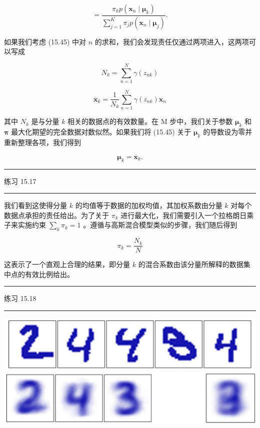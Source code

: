 \documentclass[10pt]{report}
\newcommand{\HRule}{\begin{center}\rule{0.9\linewidth}{0.2mm}\end{center}}
\begin{document}
\[
= \frac{{\pi }_{k}p\left( {{\mathbf{x}}_{n} \mid  {\mathbf{\mu }}_{k}}\right) }{\mathop{\sum }\limits_{{j = 1}}^{K}{\pi }_{j}p\left( {{\mathbf{x}}_{n} \mid  {\mathbf{\mu }}_{j}}\right) }. \tag{15.46}
\]

如果我们考虑 (15.45) 中对 \(n\) 的求和，我们会发现责任仅通过两项进入，这两项可以写成

\[
{N}_{k} = \mathop{\sum }\limits_{{n = 1}}^{N}\gamma \left( {z}_{nk}\right)  \tag{15.47}
\]

\[
{\overline{\mathbf{x}}}_{k} = \frac{1}{{N}_{k}}\mathop{\sum }\limits_{{n = 1}}^{N}\gamma \left( {z}_{nk}\right) {\mathbf{x}}_{n} \tag{15.48}
\]

其中 \({N}_{k}\) 是与分量 \(k\) 相关的数据点的有效数量。在 M 步中，我们关于参数 \({\mathbf{\mu }}_{k}\) 和 \(\mathbf{\pi }\) 最大化期望的完全数据对数似然。如果我们将 (15.45) 关于 \({\mathbf{\mu }}_{k}\) 的导数设为零并重新整理各项，我们得到

\[
{\mathbf{\mu }}_{k} = {\overline{\mathbf{x}}}_{k}. \tag{15.49}
\]

\HRule

练习 15.17

\HRule

我们看到这使得分量 \(k\) 的均值等于数据的加权均值，其加权系数由分量 \(k\) 对每个数据点承担的责任给出。为了关于 \({\pi }_{k}\) 进行最大化，我们需要引入一个拉格朗日乘子来实施约束 \(\mathop{\sum }\limits_{k}{\pi }_{k} = 1\) 。遵循与高斯混合模型类似的步骤，我们随后得到

\[
{\pi }_{k} = \frac{{N}_{k}}{N} \tag{15.50}
\]

这表示了一个直观上合理的结果，即分量 \(k\) 的混合系数由该分量所解释的数据集中点的有效比例给出。

\HRule

练习 15.18

\HRule

\begin{center}
\includegraphics[max width=1.0\textwidth]{images/0194e279-9b28-703a-88f4-c3ac21e2010d_503_255_353_1287_541_0.jpg}
\end{center}
\hspace*{3em} 
\end{document}

